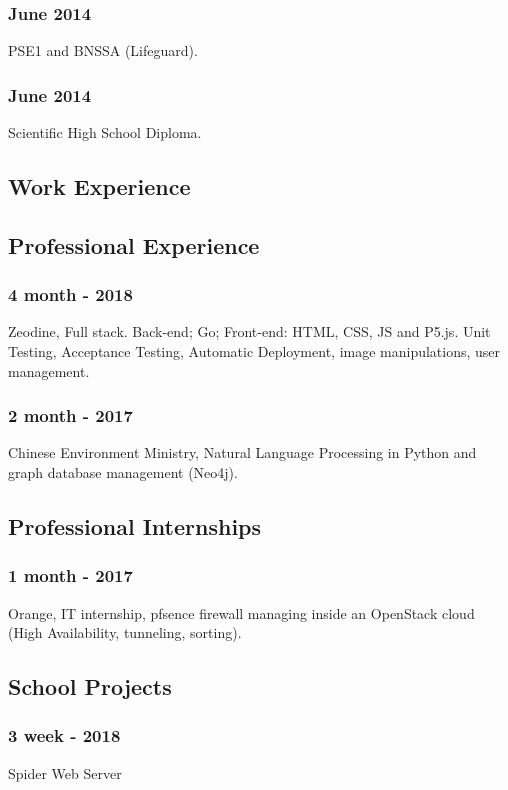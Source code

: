 \documentclass{article}
\begin{document}
        \subsubsection{June 2014}
            PSE1 and BNSSA (Lifeguard).
        \subsubsection{June 2014}
            Scientific High School Diploma.


    \begin{multicols}{2}
        \section{Work Experience}
            \subsection{Professional Experience}
                \subsubsection{4 month - 2018}
                    Zeodine, Full stack. Back-end; Go; Front-end: HTML, CSS, JS and P5.js.
                    Unit Testing, Acceptance Testing, Automatic Deployment, image manipulations, user management.
                \subsubsection{2 month - 2017}
                    Chinese Environment Ministry, Natural Language Processing in Python and graph database management (Neo4j).
            \subsection{Professional Internships}
                \subsubsection{1 month - 2017}
                    Orange, IT internship, pfsence firewall managing inside an OpenStack cloud (High Availability, tunneling, sorting).
            \subsection{School Projects}
                \subsubsection{3 week - 2018}
                    Spider Web Server

\end{multicols}
\end{document}
